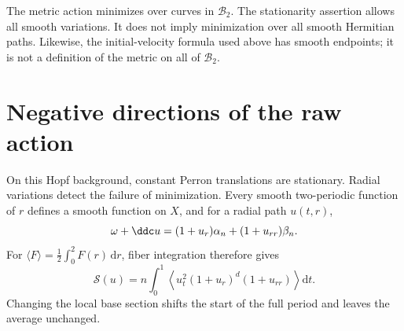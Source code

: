 The metric action minimizes over curves in $\mathcal B_2$. The stationarity assertion allows all smooth variations. It does not imply minimization over all smooth Hermitian paths. Likewise, the initial-velocity formula used above has smooth endpoints; it is not a definition of the metric on all of $\mathcal B_2$.

\section{Negative directions of the raw action}
\label{sec:hopf-action-saddles}

On this Hopf background, constant Perron translations are stationary. Radial variations detect the failure of minimization. Every smooth two-periodic function of $r$ defines a smooth function on $X$, and for a radial path $u(t,r)$,
\[
 \omega+\ddc u=(1+u_r)\alpha_n+(1+u_{rr})\beta_n.
\]
For $\langle F\rangle=\frac12\int_0^2F(r)\,\mathrm dr$, fiber integration therefore gives
\begin{equation}\label{eq:hopf-radial-action}
 \mathscr S(u)=n\int_0^1
 \left\langle u_t^2(1+u_r)^d(1+u_{rr})\right\rangle\mathrm dt.
\end{equation}
Changing the local base section shifts the start of the full period and leaves the average unchanged.

